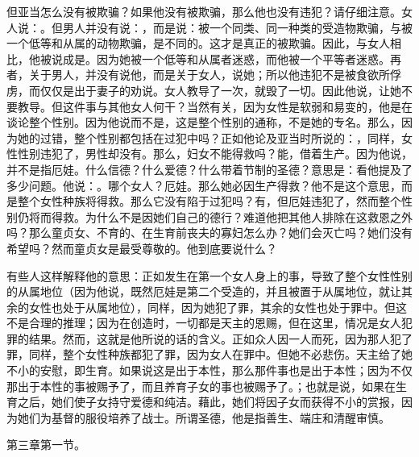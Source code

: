 但亚当怎么没有被欺骗？如果他没有被欺骗，那么他也没有违犯？请仔细注意。女人说：。但男人并没有说：，而是说：被一个同类、同一种类的受造物欺骗，与被一个低等和从属的动物欺骗，是不同的。这才是真正的被欺骗。因此，与女人相比，他被说成是。因为她被一个低等和从属者迷惑，而他被一个平等者迷惑。再者，关于男人，并没有说他，而是关于女人，说她；所以他违犯不是被食欲所俘虏，而仅仅是出于妻子的劝说。女人教导了一次，就毁了一切。因此他说，让她不要教导。但这件事与其他女人何干？当然有关，因为女性是软弱和易变的，他是在谈论整个性别。因为他说而不是，这是整个性别的通称，不是她的专名。那么，因为她的过错，整个性别都包括在过犯中吗？正如他论及亚当时所说的：，同样，女性性别违犯了，男性却没有。那么，妇女不能得救吗？能，借着生产。因为他说，并不是指厄娃。什么信德？什么爱德？什么带着节制的圣德？意思是：看他提及了多少问题。他说：。哪个女人？厄娃。那么她必因生产得救？他不是这个意思，而是整个女性种族将得救。那么它没有陷于过犯吗？有，但厄娃违犯了，然而整个性别仍将而得救。为什么不是因她们自己的德行？难道他把其他人排除在这救恩之外吗？那么童贞女、不育的、在生育前丧夫的寡妇怎么办？她们会灭亡吗？她们没有希望吗？然而童贞女是最受尊敬的。他到底要说什么？\par

有些人这样解释他的意思：正如发生在第一个女人身上的事，导致了整个女性性别的从属地位（因为他说，既然厄娃是第二个受造的，并且被置于从属地位，就让其余的女性也处于从属地位），同样，因为她犯了罪，其余的女性也处于罪中。但这不是合理的推理；因为在创造时，一切都是天主的恩赐，但在这里，情况是女人犯罪的结果。然而，这就是他所说的话的含义。正如众人因一人而死，因为那人犯了罪，同样，整个女性种族都犯了罪，因为女人在罪中。但她不必悲伤。天主给了她不小的安慰，即生育。如果说这是出于本性，那么那件事也是出于本性；因为不仅那出于本性的事被赐予了，而且养育子女的事也被赐予了。；也就是说，如果在生育之后，她们使子女持守爱德和纯洁。藉此，她们将因子女而获得不小的赏报，因为她们为基督的服役培养了战士。所谓圣德，他是指善生、端庄和清醒审慎。\par

第三章第一节。\par


